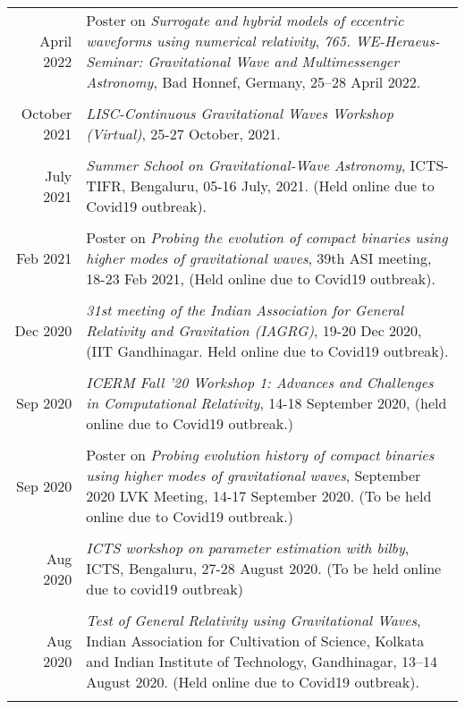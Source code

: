 \documentclass[12pt]{article}
\begin{document}
\begin{longtable}{rp{14cm}}
  April 2022 & Poster on {\itshape Surrogate and hybrid models of eccentric waveforms using numerical relativity}, {\itshape 765. WE-Heraeus-Seminar: Gravitational Wave and Multimessenger Astronomy}, Bad Honnef, Germany, 25--28 April 2022.\\\\
  October 2021 & {\itshape LISC-Continuous Gravitational Waves Workshop (Virtual)}, 25-27 October, 2021.\\\\
  July 2021 & {\itshape Summer School on Gravitational-Wave Astronomy}, ICTS-TIFR, Bengaluru, 05-16 July, 2021. (Held online due to Covid19 outbreak).\\\\ 
  Feb 2021 & {Poster} on {\itshape Probing the evolution of compact binaries using higher modes of gravitational waves}, 39th ASI meeting, 18-23 Feb 2021, (Held online due to Covid19 outbreak).\\\\  
  Dec 2020 & {\itshape 31st meeting of the Indian Association for General Relativity and Gravitation (IAGRG)}, 19-20 Dec 2020, (IIT Gandhinagar. Held online due to Covid19 outbreak).\\\\

  Sep 2020 & {\itshape ICERM Fall '20 Workshop 1: Advances and Challenges in  
             Computational Relativity}, 14-18 September 2020, (held online due
             to Covid19 outbreak.)\\\\
  Sep 2020 & {Poster} on {\itshape Probing evolution history of compact
             binaries using higher modes of gravitational waves}, September 2020 LVK Meeting, 14-17 September 2020. (To be held online due to Covid19 outbreak.)\\\\

  Aug 2020 & {\itshape ICTS workshop on parameter estimation with bilby}, ICTS, Bengaluru, 27-28 August 2020. (To be held online due to covid19 outbreak)\\\\
  
  Aug 2020 & {\itshape Test of General Relativity using Gravitational Waves}, Indian Association for Cultivation of Science, Kolkata and Indian Institute of Technology, Gandhinagar, 13--14 August 2020. (Held online due to Covid19 outbreak).\\\\
  

\end{longtable}
\end{document}
